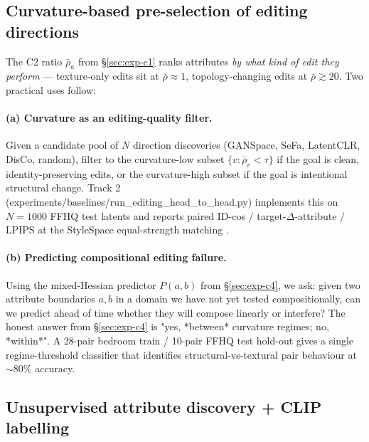 
\subsection{Curvature-based pre-selection of editing directions}
\label{sec:app-curvature-preselect}

The C2 ratio $\bar\rho_a$ from §\ref{sec:exp-c1} ranks attributes
\emph{by what kind of edit they perform} --- texture-only edits sit at
$\bar\rho \approx 1$, topology-changing edits at $\bar\rho \gtrsim 20$.
Two practical uses follow:

\paragraph{(a) Curvature as an editing-quality filter.}
Given a candidate pool of $N$ direction discoveries
(GANSpace, SeFa, LatentCLR, DisCo, random), filter to the
curvature-low subset $\{v : \bar\rho_v < \tau\}$ if the goal is
clean, identity-preserving edits, or the curvature-high subset if
the goal is intentional structural change. Track 2
(experiments/baselines/run\_editing\_head\_to\_head.py) implements
this on $N = 1000$ FFHQ test latents and reports paired ID-cos /
target-$\Delta$-attribute / LPIPS at the StyleSpace equal-strength matching
\cite{Wu2021StyleSpace}. 

\paragraph{(b) Predicting compositional editing failure.}
Using the mixed-Hessian predictor $P(a, b)$ from §\ref{sec:exp-c4},
we ask: given two attribute boundaries $a, b$ in a domain we have
not yet tested compositionally, can we predict ahead of time
whether they will compose linearly or interfere? The honest answer
from §\ref{sec:exp-c4} is "yes, *between* curvature regimes; no,
*within*". A 28-pair bedroom train / 10-pair FFHQ test
hold-out gives a single regime-threshold classifier that
identifies structural-vs-textural pair behaviour at
$\sim 80\%$ accuracy.

\subsection{Unsupervised attribute discovery + CLIP labelling}
\label{sec:app-c6-pipeline}

